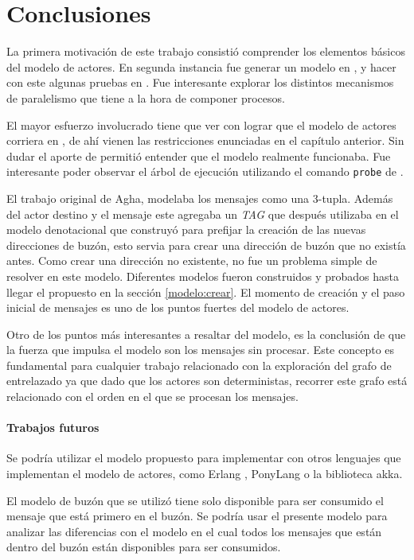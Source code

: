\chapter{Conclusiones}

La primera motivación de este trabajo consistió comprender los elementos básicos del modelo de actores. En segunda instancia fue generar un modelo en \CSP, y hacer con este algunas pruebas en \FDR. Fue interesante explorar los distintos mecanismos de paralelismo que tiene \CSP a la hora de componer procesos. 

El mayor esfuerzo involucrado tiene que ver con lograr que el modelo de actores corriera en \FDR, de ahí vienen las restricciones enunciadas en el capítulo anterior. Sin dudar el aporte de \FDR permitió entender que el modelo realmente funcionaba. Fue interesante poder observar el árbol de ejecución utilizando el comando \verb=probe= de \FDR. 

El trabajo original de Agha\cite{Agha:1986:AMC:7929}, modelaba los mensajes como una 3-tupla. Además del actor destino y el mensaje este agregaba un \textit{TAG} que después utilizaba en el modelo denotacional que construyó para prefijar la creación de las nuevas direcciones de buzón, esto servia para crear una dirección de buzón que no existía antes. Como crear una dirección no existente, no fue un problema simple de resolver en este modelo. Diferentes modelos fueron construidos y probados hasta llegar el propuesto en la sección \ref{modelo:crear}. El momento de creación y el paso inicial de mensajes es uno de los puntos fuertes del modelo de actores.

Otro de los puntos más interesantes a resaltar del modelo, es la conclusión de que la fuerza que impulsa el modelo son los mensajes sin procesar. Este concepto es fundamental para cualquier trabajo relacionado con la exploración del grafo de entrelazado ya que dado que los actores son deterministas, recorrer este grafo está relacionado con el orden en el que se procesan los mensajes.


\subsubsection*{Trabajos futuros}

Se podría utilizar el modelo propuesto para implementar con otros lenguajes que implementan el modelo de actores, como Erlang \cite{Armstrong:1996:CPE:229883, Cesarini:2009:EP:1}, PonyLang\cite{ponylang} o la biblioteca akka\cite{Wyatt:2013:AC:2663429}.

El modelo de buzón que se utilizó tiene solo disponible para ser consumido el mensaje que está primero en el buzón. Se podría usar el presente modelo para analizar las diferencias con el modelo en el cual todos los mensajes que están dentro del buzón están disponibles para ser consumidos.
